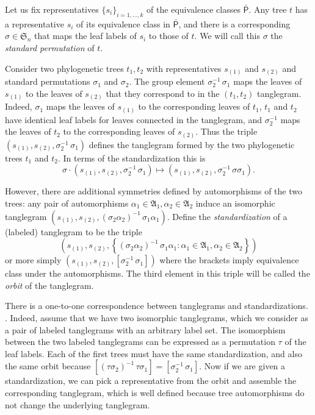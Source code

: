 \documentclass{amsart}
\newcommand{\fS}{\mathfrak S}
\newcommand{\fA}{\mathfrak A}
\newcommand{\ptree}{\mathsf{P}}
\newcommand{\ptequiv}{\bar{\ptree}}  %
\begin{document}
Let us fix representatives $\{s_i\}_{i=1,\ldots,k}$ of the equivalence classes $\ptequiv$.
Any tree $t$ has a representative $s_i$ of its equivalence class in $\ptequiv$, and there is a corresponding $\sigma \in \fS_n$ that maps the leaf labels of $s_i$ to those of $t$.
We will call this $\sigma$ the \emph{standard permutation} of $t$.

Consider two phylogenetic trees $t_1, t_2$ with representatives $s_{(1)}$ and $s_{(2)}$ and standard permutations $\sigma_1$ and $\sigma_2$.
The group element $\sigma_2^{-1} \, \sigma_1$ maps the leaves of $s_{(1)}$ to the leaves of $s_{(2)}$ that they correspond to in the $(t_1, t_2)$ tanglegram.
Indeed, $\sigma_1$ maps the leaves of $s_{(1)}$ to the corresponding leaves of $t_1$, $t_1$ and $t_2$ have identical leaf labels for leaves connected in the tanglegram, and $\sigma_2^{-1}$ maps the leaves of $t_2$ to the corresponding leaves of $s_{(2)}$.
Thus the triple $(s_{(1)}, s_{(2)}, \sigma_2^{-1} \, \sigma_1)$ defines the tanglegram formed by the two phylogenetic trees $t_1$ and $t_2$.
In terms of the standardization this is
\[
\sigma \cdot (s_{(1)}, s_{(2)}, \sigma_2^{-1} \, \sigma_1) \mapsto (s_{(1)}, s_{(2)}, \sigma_2^{-1} \, \sigma \sigma_1).
\]



However, there are additional symmetries defined by automorphisms of the two trees: any pair of automorphisms $\alpha_1 \in \fA_1, \alpha_2 \in \fA_2$ induce an isomorphic tanglegram $(s_{(1)}, s_{(2)}, \left(\sigma_2 \alpha_2 \right)^{-1} \, \sigma_1 \alpha_1)$.
Define the \emph{standardization} of a (labeled) tanglegram to be the triple
\begin{equation}
\label{eq:orbit}
\left(s_{(1)}, s_{(2)}, \left\{(\sigma_2 \alpha_2)^{-1} \, \sigma_1 \alpha_1 : \alpha_1 \in \fA_1, \alpha_2 \in \fA_2  \right\}\right)
\end{equation}
or more simply $(s_{(1)}, s_{(2)}, [\sigma_2^{-1} \, \sigma_1])$ where the brackets imply equivalence class under the automorphisms.
The third element in this triple will be called the \emph{orbit} of the tanglegram.

There is a one-to-one correspondence between tanglegrams and standardizations.
.
Indeed, assume that we have two isomorphic tanglegrams, which we consider as a pair of labeled tanglegrams with an arbitrary label set.
The isomorphism between the two labeled tanglegrams can be expressed as a permutation $\tau$ of the leaf labels.
Each of the first trees must have the same standardization, and also the same orbit because $[\left(\tau \sigma_2\right)^{-1} \, \tau \sigma_1] = [\sigma_2^{-1} \, \sigma_1]$.
Now if we are given a standardization, we can pick a representative from the orbit and assemble the corresponding tanglegram, which is well defined because tree automorphisms do not change the underlying tanglegram.
\end{document}
